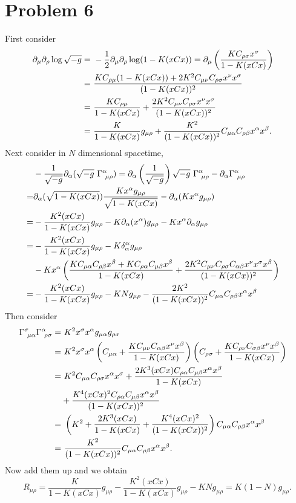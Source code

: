 \documentclass{article}
\begin{document}
\section*{Problem 6}
First consider 
\begin{align}
    \partial_\mu \partial_\rho \log \sqrt{-g} =&~ 
    -\frac{1}{2} \partial_\mu \partial_\rho \log(1-K(xCx))
    = \partial_\mu\left(\frac{K C_{\rho \sigma} x^\sigma}{1-K(xCx)}\right)\cr
    =&~ \frac{KC_{\rho \mu}(1-K(xCx))+2K^2C_{\mu \nu}C_{\rho \sigma}x^\nu x^\sigma}
    {(1-K(xCx))^2}\cr
    =&~ \frac{KC_{\rho \mu}}{1-K(xCx)}
    + \frac{2K^2C_{\mu \nu}C_{\rho \sigma} x^\nu x^\sigma}{(1-K(xCx))^2}\cr
    =&~\frac{K}{1-K(xCx)}g_{\mu \rho}
    +\frac{K^2}{(1-K(xCx))^2}C_{\mu \alpha}C_{\rho \beta} x^\alpha x^\beta.
\end{align}
Next consider in $N$ dimensional spacetime,
\begin{align}
    &-\frac{1}{\sqrt{-g}}\partial_\alpha(\sqrt{-g} ~\Gamma^\alpha_{~\mu \rho})
    =\partial_\alpha\left(\frac{1}{\sqrt{-g}}\right)\sqrt{-g}~\Gamma^\alpha_{~\mu \rho}
    -\partial_\alpha \Gamma^\alpha_{~\mu \rho} \cr
    =&\partial_\alpha (\sqrt{1-K(xCx)})
    \frac{K x^\alpha g_{\mu \rho}}{\sqrt{1-K(xCx)}}
    -\partial_\alpha (K x^\alpha g_{\mu \rho})\cr
    =&-\frac{K^2(xCx)}{1-K(xCx)}g_{\mu \rho}
    -K\partial_\alpha(x^\alpha) g_{\mu \rho} - K x^\alpha \partial_\alpha g_{\mu \rho}\cr
    =&-\frac{K^2(xCx)}{1-K(xCx)}g_{\mu \rho}
    -K \delta^\alpha_\alpha g_{\mu \rho}\cr
    &- Kx^\alpha \left(
        \frac{K C_{\mu \alpha}C_{\rho \beta}x^\beta + K C_{\rho \alpha}C_{\mu \beta}x^\beta}
        {1-K(xCx)} + \frac{2K^2 C_{\mu \nu} C_{\rho \sigma} C_{\alpha \beta}x^\nu x^\sigma x^\beta}
        {(1-K(xCx))^2}
    \right)\cr
    =&-\frac{K^2(xCx)}{1-K(xCx)}g_{\mu \rho}
    -K N g_{\mu \rho} - \frac{2K^2 }{(1-K(xCx))^2}C_{\mu \alpha}C_{\rho \beta}x^\alpha x^\beta
\end{align}
Then consider
\begin{align}
    \Gamma^\sigma_{~\mu \alpha} \Gamma^\alpha_{~\rho \sigma}
    =&~ K^2 x^\sigma x^\alpha g_{\mu \alpha} g_{\rho \sigma}\cr
    =&~ K^2 x^\sigma x^\alpha 
    \left(
        C_{\mu \alpha} + \frac{K C_{\mu \nu} C_{\alpha\beta}x^\nu x^\beta}
        {1-K(xCx)}
    \right)
    \left(
        C_{\rho \sigma} + \frac{K C_{\rho \nu} C_{\sigma\beta}x^\nu x^\beta}
        {1-K(xCx)}
    \right)\cr
    =&~ K^2 C_{\mu \alpha} C_{\rho \sigma} x^\alpha x^\sigma
    + \frac{2K^3(xCx) C_{\rho\alpha}C_{\mu \beta}x^\alpha x^\beta}
    {1-K(xCx)}\cr
    &+ \frac{K^4 (xCx)^2 C_{\rho \alpha } C_{\mu \beta}x^\alpha x^\beta}
    {(1-K(xCx))^2}\cr
    =&~\left(
        K^2 + \frac{2K^3 (xCx)}{1-K(xCx)} + \frac{K^4(xCx)^2}{(1-K(xCx))^2}
    \right)
    C_{\mu \alpha}C_{\rho \beta}x^\alpha x^\beta \cr
    =&~ \frac{K^2}{(1-K(xCx))^2}
    C_{\mu \alpha}C_{\rho \beta}x^\alpha x^\beta.
\end{align}
Now add them up and we obtain
\begin{equation}
    R_{\mu \rho} = \frac{K}{1-K(xCx)}g_{\mu \rho}
    -\frac{K^2(xCx)}{1-K(xCx)}g_{\mu \rho}
    -K N g_{\mu \rho} = K(1-N)g_{\mu \rho}.
\end{equation}
\end{document}
